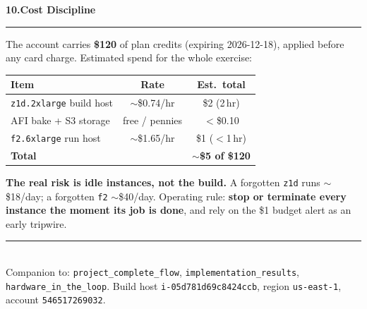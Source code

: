 \documentclass[10pt,a4paper]{article}
\newcommand{\sectionrule}{\par\nobreak\vspace{1pt}\textcolor{rulegray}{\rule{\linewidth}{0.8pt}}\par\vspace{1pt}}
\newcommand{\fpath}[1]{\texttt{\textcolor{hdrblue}{#1}}}
\newcommand{\sechead}[2]{{\large\bfseries\color{hdrblue} #1\quad #2}\sectionrule}
\begin{document}
\sechead{10.}{Cost Discipline}

The account carries \textbf{\$120} of plan credits (expiring 2026-12-18), applied
before any card charge. Estimated spend for the whole exercise:

\begin{center}\small
\begin{tabular}{@{}lcc@{}}
\toprule
\textbf{Item} & \textbf{Rate} & \textbf{Est.\ total} \\
\midrule
\fpath{z1d.2xlarge} build host & $\sim$\$0.74/hr & \$2\textendash6 (2\textendash4\,hr) \\
AFI bake + S3 storage          & free / pennies  & $<$\$0.10 \\
\fpath{f2.6xlarge} run host    & $\sim$\$1.65/hr & \$1\textendash3 ($<$1\,hr) \\
\midrule
\textbf{Total} & & \textbf{$\sim$\$5\textendash10 of \$120} \\
\bottomrule
\end{tabular}
\end{center}

\begin{warnbox}
\textbf{The real risk is idle instances, not the build.} A forgotten
\fpath{z1d} runs $\sim$\$18/day; a forgotten \fpath{f2} $\sim$\$40/day. Operating
rule: \textbf{stop or terminate every instance the moment its job is done}, and
rely on the \$1 budget alert as an early tripwire.
\end{warnbox}

\vfill
{\small\color{rulegray}\rule{\linewidth}{0.4pt}\\
Companion to: \fpath{project\_complete\_flow}, \fpath{implementation\_results},
\fpath{hardware\_in\_the\_loop}. Build host \fpath{i-05d781d69c8424ccb},
region \fpath{us-east-1}, account \fpath{546517269032}.}
\end{document}
